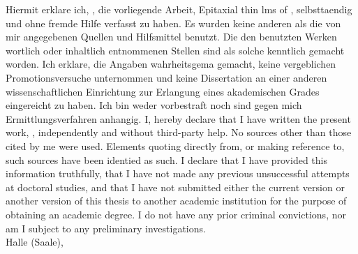 
Hiermit erklare ich, \thesisAuthor, die vorliegende Arbeit, Epitaxial thin
lms of \thesisTitle, selbsttaendig und ohne fremde Hilfe verfasst zu haben.
Es wurden keine anderen als die von mir angegebenen Quellen und Hilfsmittel
benutzt. Die den benutzten Werken wortlich oder inhaltlich entnommenen
Stellen sind als solche kenntlich gemacht worden. Ich erklare, die Angaben
wahrheitsgema gemacht, keine vergeblichen Promotionsversuche unternommen
und keine Dissertation an einer anderen wissenschaftlichen Einrichtung
zur Erlangung eines akademischen Grades eingereicht zu haben. Ich bin
weder vorbestraft noch sind gegen mich Ermittlungsverfahren anhangig.
I, \thesisAuthor hereby declare that I have written the present work,
\thesisTitleDisplay, independently and without third-party
help. No sources other than those cited by me were used. Elements quoting
directly from, or making reference to, such sources have been identied as
such. I declare that I have provided this information truthfully, that I have
not made any previous unsuccessful attempts at doctoral studies, and that I
have not submitted either the current version or another version of this thesis
to another academic institution for the purpose of obtaining an academic
degree. I do not have any prior criminal convictions, nor am I subject to any
preliminary investigations. \\
Halle (Saale), \thesisDateOralExam\  \thesisAuthor